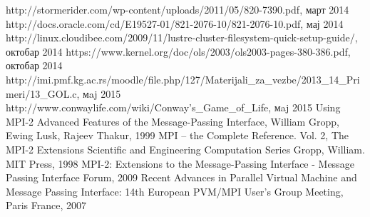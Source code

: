 %
%
\begin{thebibliography}{11}
 {http://stormerider.com/wp-content/uploads/2011/05/820-7390.pdf, март 2014}
 {http://docs.oracle.com/cd/E19527-01/821-2076-10/821-2076-10.pdf, мај 2014}
 {http://linux.cloudibee.com/2009/11/lustre-cluster-filesystem-quick-setup-guide/, октобар 2014}
 {https://www.kernel.org/doc/ols/2003/ols2003-pages-380-386.pdf, октобар 2014}
 {http://imi.pmf.kg.ac.rs/moodle/file.php/127/Materijali\_za\_vezbe/2013\_14\_Primeri/13\_GOL.c, мaj 2015}
 {http://www.conwaylife.com/wiki/Conway's\_Game\_of\_Life, мaj 2015}
 {Using MPI-2 Advanced Features of the Message-Passing Interface, William Gropp, Ewing Lusk, Rajeev Thakur, 1999}
 {MPI -- the Complete Reference. Vol. 2, The MPI-2 Extensions Scientific and Engineering Computation Series Gropp, William. MIT Press, 1998}
 {MPI-2: Extensions to the Message-Passing Interface - Message Passing Interface Forum, 2009}
 {Recent Advances in Parallel Virtual Machine and Message Passing Interface: 14th European PVM/MPI User's Group Meeting, Paris France, 2007}
\end{thebibliography}